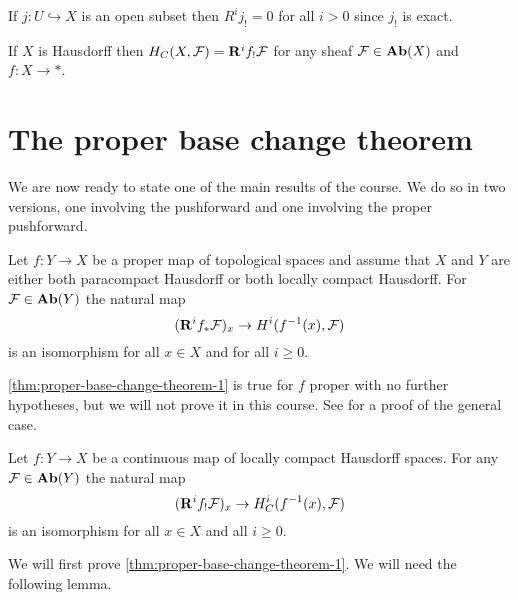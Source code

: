 \begin{exc}
	If $j: U \hookrightarrow X$ is an open subset then $R^ij_! = 0$ for all $i > 0$ since $j_!$ is exact.
\end{exc}

\begin{exc}
	If $X$ is Hausdorff then $\cohomology_C(X, \sh{F}) = \rightderived^i f_!\sh{F}$ for any sheaf $\mathcal{F} \in \operatorname{\mathbf{Ab}}(X)$ and $f: X \to *$. 
\end{exc}

\section{The proper base change theorem}
We are now ready to state one of the main results of the course. We do so in two versions, one involving the pushforward and one involving the proper pushforward.

\begin{thm}\label{thm:proper-base-change-theorem-1}
	Let $f: Y \to X$ be a proper map of topological spaces and assume that $X$ and $Y$ are either both paracompact Hausdorff or both locally compact Hausdorff. For $\mathcal{F} \in \operatorname{\mathbf{Ab}}(Y)$ the natural map \[
    	(\rightderived^i f_* \sh{F})_x \to \cohomology^i(f^{-1}(x), \sh{F})
    \] is an isomorphism for all $x \in X$ and for all $i \geq 0$. 
\end{thm}

\begin{rmk}
	\cref{thm:proper-base-change-theorem-1} is true for $f$ proper with no further hypotheses, but we will not prove it in this course. See \cite[Lemma 09V6]{stacks-project} for a proof of the general case. 
\end{rmk}

\begin{thm}\label{thm:proper-base-changed-theorem-2}
	Let $f: Y \to X$ be a continuous map of locally compact Hausdorff spaces. For any $\mathcal{F} \in \operatorname{\mathbf{Ab}}(Y)$ the natural map \[
    	(\rightderived^i f_! \sh{F})_x \to \cohomology^i_C(f^{-1}(x), \sh{F})
    \] is an isomorphism for all $x \in X$ and all $i \geq 0$.
\end{thm}

We will first prove \cref{thm:proper-base-change-theorem-1}. We will need the following lemma.

